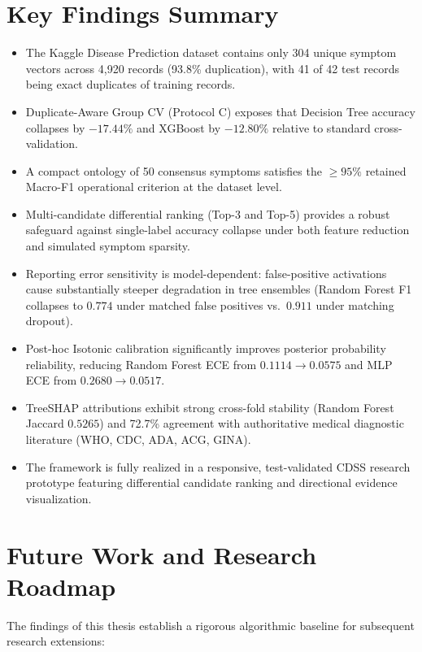 \section{Key Findings Summary}
\label{sec:key_findings}
\begin{itemize}
    \item The Kaggle Disease Prediction dataset contains only 304 unique symptom vectors across 4,920 records (93.8\% duplication), with 41 of 42 test records being exact duplicates of training records.
    \item Duplicate-Aware Group CV (Protocol C) exposes that Decision Tree accuracy collapses by $-17.44\%$ and XGBoost by $-12.80\%$ relative to standard cross-validation.
    \item A compact ontology of 50 consensus symptoms satisfies the $\ge 95\%$ retained Macro-F1 operational criterion at the dataset level.
    \item Multi-candidate differential ranking (Top-3 and Top-5) provides a robust safeguard against single-label accuracy collapse under both feature reduction and simulated symptom sparsity.
    \item Reporting error sensitivity is model-dependent: false-positive activations cause substantially steeper degradation in tree ensembles (Random Forest F1 collapses to $0.774$ under matched false positives vs.\ $0.911$ under matching dropout).
    \item Post-hoc Isotonic calibration significantly improves posterior probability reliability, reducing Random Forest ECE from $0.1114 \to 0.0575$ and MLP ECE from $0.2680 \to 0.0517$.
    \item TreeSHAP attributions exhibit strong cross-fold stability (Random Forest Jaccard $0.5265$) and 72.7\% agreement with authoritative medical diagnostic literature (WHO, CDC, ADA, ACG, GINA).
    \item The framework is fully realized in a responsive, test-validated CDSS research prototype featuring differential candidate ranking and directional evidence visualization.
\end{itemize}

\section{Future Work and Research Roadmap}
\label{sec:future_work}

The findings of this thesis establish a rigorous algorithmic baseline for subsequent research extensions:

